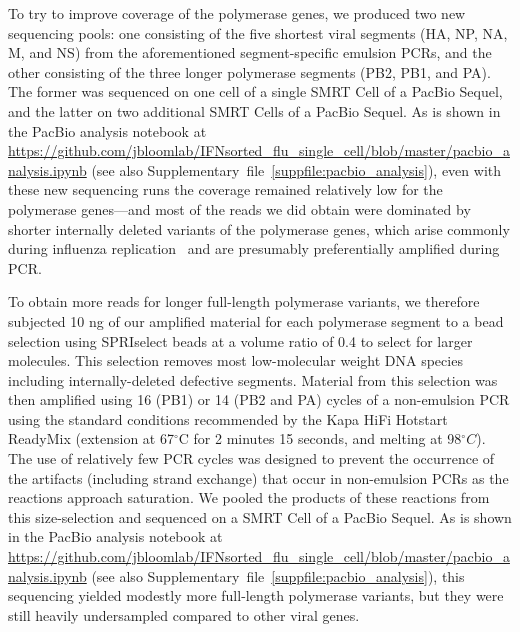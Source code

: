 \documentclass[9pt,lineno]{elife}
\begin{document}
To try to improve coverage of the polymerase genes, we produced two new sequencing pools: one consisting of the five shortest viral segments (HA, NP, NA, M, and NS) from the aforementioned segment-specific emulsion PCRs, and the other consisting of the three longer polymerase segments (PB2, PB1, and PA).
The former was sequenced on one cell of a single SMRT Cell of a PacBio Sequel, and the latter on two additional SMRT Cells of a PacBio Sequel. 
As is shown in the PacBio analysis notebook at \url{https://github.com/jbloomlab/IFNsorted_flu_single_cell/blob/master/pacbio_analysis.ipynb} (see also Supplementary~file~\ref{suppfile:pacbio_analysis}), even with these new sequencing runs the coverage remained relatively low for the polymerase genes---and most of the reads we did obtain were dominated by shorter internally deleted variants of the polymerase genes, which arise commonly during influenza replication~\citep{xue2016propagation} and are presumably preferentially amplified during PCR.

To obtain more reads for longer full-length polymerase variants, we therefore subjected 10 ng of our amplified material for each polymerase segment to a bead selection using SPRIselect beads at a volume ratio of 0.4 to select for larger molecules. 
This selection removes most low-molecular weight DNA species including internally-deleted defective segments.
Material from this selection was then amplified using 16 (PB1) or 14 (PB2 and PA) cycles of a non-emulsion PCR using the standard conditions recommended by the Kapa HiFi Hotstart ReadyMix (extension at 67$^{\circ}$C for 2 minutes 15 seconds, and melting at 98$^{\circ}C$).
The use of relatively few PCR cycles was designed to prevent the occurrence of the artifacts (including strand exchange) that occur in non-emulsion PCRs as the reactions approach saturation.
We pooled the products of these reactions from this size-selection and sequenced on a SMRT Cell of a PacBio Sequel.
As is shown in the PacBio analysis notebook at \url{https://github.com/jbloomlab/IFNsorted_flu_single_cell/blob/master/pacbio_analysis.ipynb} (see also Supplementary~file~\ref{suppfile:pacbio_analysis}), this sequencing yielded modestly more full-length polymerase variants, but they were still heavily undersampled compared to other viral genes.
\end{document}
